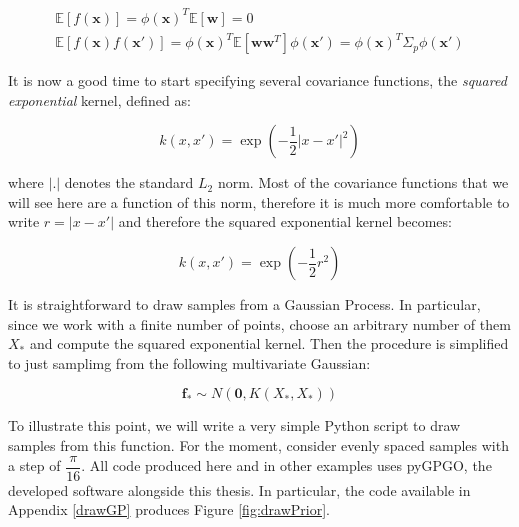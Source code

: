 \documentclass[10pt,a4paper,twoside]{book}
\begin{document}
\begin{align}
\mathbb{E}\left[f(\boldsymbol{x})\right] = \phi(\boldsymbol{x})^T\mathbb{E}\left[\boldsymbol{w}\right] = 0\\
\mathbb{E}\left[f(\boldsymbol{x})f(\boldsymbol{x'})\right] = \phi(\boldsymbol{x})^T\mathbb{E}\left[\boldsymbol{w}\boldsymbol{w}^T\right]
\phi(\boldsymbol{x'}) = \phi(\boldsymbol{x})^T\Sigma_p\phi(\boldsymbol{x'})
\end{align}

It is now a good time to start specifying several covariance functions, the \textit{squared exponential} kernel, defined as:

\begin{equation}
k(x, x') = \exp\left(-\dfrac{1}{2}|x - x'|^2\right)
\end{equation}

where $|.|$ denotes the standard $L_2$ norm. Most of the covariance functions that we will see here are a function of this norm, therefore it is much more comfortable to write $r = |x - x'|$ and therefore the squared exponential kernel becomes:

\begin{equation}
\label{sqexp}
k(x, x') = \exp\left(-\dfrac{1}{2}r^2\right)
\end{equation}

It is straightforward to draw samples from a Gaussian Process. In particular, since we work with a finite number of points, choose an arbitrary number of them $X_*$ and compute the squared exponential kernel. Then the procedure is simplified to just samplimg from the following multivariate Gaussian:

\begin{equation}
\label{fprior}
\boldsymbol{f_*} \sim N\left(\boldsymbol{0}, K(X_*, X_*)\right)
\end{equation}

To illustrate this point, we will write a very simple Python script to draw samples from this function. For the moment, consider evenly spaced samples with a step of $\dfrac{\pi}{16}$. All code produced here and in other examples uses pyGPGO, the developed software alongside this thesis. In particular, the code available in Appendix \ref{drawGP} produces Figure \ref{fig:drawPrior}.\\
\end{document}
